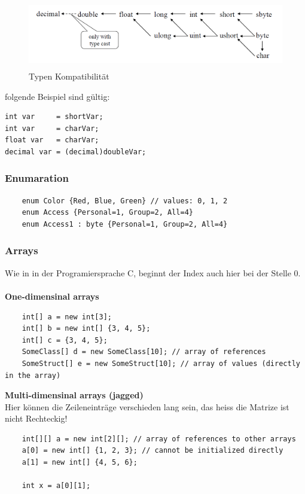 \begin{figure}[h]
	\centering
	\includegraphics[height=3cm, ]{images/CSharp/TypenKompatibilitaet}
	\caption{Typen Kompatibilität}
\end{figure}

folgende Beispiel sind gültig:

\begin{lstlisting}
int var     = shortVar;
int var     = charVar;
float var   = charVar;
decimal var = (decimal)doubleVar;
\end{lstlisting}

\subsubsection{Enumaration}
\begin{lstlisting}
	enum Color {Red, Blue, Green} // values: 0, 1, 2
	enum Access {Personal=1, Group=2, All=4}
	enum Access1 : byte {Personal=1, Group=2, All=4}
\end{lstlisting}

\subsubsection{Arrays}
Wie in in der Programiersprache C, beginnt der Index auch hier bei der Stelle 0.\\ \\
\textbf{One-dimensinal arrays}
\begin{lstlisting}
	int[] a = new int[3];
	int[] b = new int[] {3, 4, 5};
	int[] c = {3, 4, 5};
	SomeClass[] d = new SomeClass[10]; // array of references
	SomeStruct[] e = new SomeStruct[10]; // array of values (directly in the array)
\end{lstlisting}

\textbf{Multi-dimensinal arrays (jagged)}\\
Hier können die Zeileneinträge verschieden lang sein, das heiss die Matrize ist nicht Rechteckig!
\begin{lstlisting}
	int[][] a = new int[2][]; // array of references to other arrays
	a[0] = new int[] {1, 2, 3}; // cannot be initialized directly
	a[1] = new int[] {4, 5, 6};
	
	int x = a[0][1];
\end{lstlisting}

